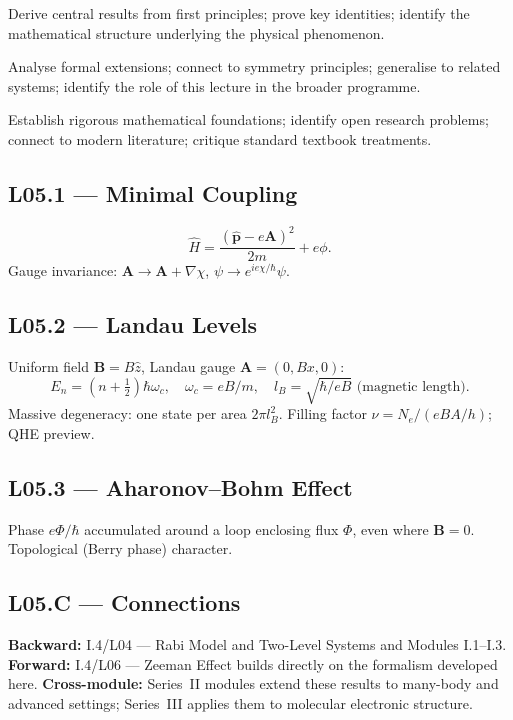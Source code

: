 \quad
Derive central results from first principles; prove key identities; identify
the mathematical structure underlying the physical phenomenon.

\quad
Analyse formal extensions; connect to symmetry principles; generalise to
related systems; identify the role of this lecture in the broader programme.

\quad
Establish rigorous mathematical foundations; identify open research problems;
connect to modern literature; critique standard textbook treatments.


\subsection*{L05.1 — Minimal Coupling}
\begin{tcolorbox}[lecturebox, title={Minimal Coupling Hamiltonian}]
\begin{equation}
  \hat{H} = \frac{(\hat{\mathbf{p}}-e\mathbf{A})^2}{2m} + e\phi.
  \label{eq:L05.1}
\end{equation}
Gauge invariance: $\mathbf{A}\to\mathbf{A}+\nabla\chi$, $\psi\to e^{ie\chi/\hbar}\psi$.
\end{tcolorbox}

\subsection*{L05.2 — Landau Levels}
Uniform field $\mathbf{B}=B\hat{z}$, Landau gauge $\mathbf{A}=(0,Bx,0)$:
\begin{equation}
  E_n = \left(n+\tfrac{1}{2}\right)\hbar\omega_c, \quad \omega_c = eB/m,
  \quad l_B = \sqrt{\hbar/eB}\text{ (magnetic length)}.
  \label{eq:L05.2}
\end{equation}
Massive degeneracy: one state per area $2\pi l_B^2$.
Filling factor $\nu = N_e/(eBA/h)$; QHE preview.

\subsection*{L05.3 — Aharonov–Bohm Effect}
Phase $e\Phi/\hbar$ accumulated around a loop enclosing flux $\Phi$,
even where $\mathbf{B}=0$. Topological (Berry phase) character.


\subsection*{L05.C — Connections}
\label{sec:L05.C}
\textbf{Backward:} I.4/L04 — Rabi Model and Two-Level Systems and Modules I.1–I.3.
\textbf{Forward:} I.4/L06 — Zeeman Effect builds directly on the formalism developed here.
\textbf{Cross-module:} Series~II modules extend these results to many-body and
advanced settings; Series~III applies them to molecular electronic structure.

